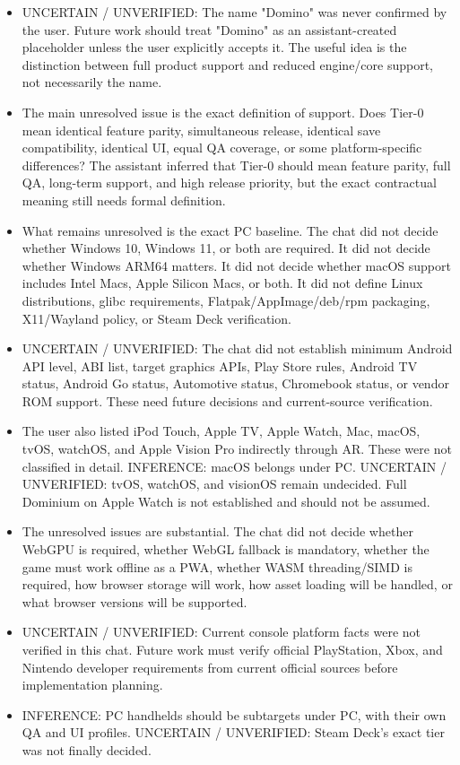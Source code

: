 \documentclass[11pt,a4paper]{report}
\begin{document}
\begin{itemize}
\item UNCERTAIN / UNVERIFIED: The name "Domino" was never confirmed by the user. Future work should treat "Domino" as an assistant-created placeholder unless the user explicitly accepts it. The useful idea is the distinction between full product support and reduced engine/core support, not necessarily the name.
\item The main unresolved issue is the exact definition of support. Does Tier-0 mean identical feature parity, simultaneous release, identical save compatibility, identical UI, equal QA coverage, or some platform-specific differences? The assistant inferred that Tier-0 should mean feature parity, full QA, long-term support, and high release priority, but the exact contractual meaning still needs formal definition.
\item What remains unresolved is the exact PC baseline. The chat did not decide whether Windows 10, Windows 11, or both are required. It did not decide whether Windows ARM64 matters. It did not decide whether macOS support includes Intel Macs, Apple Silicon Macs, or both. It did not define Linux distributions, glibc requirements, Flatpak/AppImage/deb/rpm packaging, X11/Wayland policy, or Steam Deck verification.
\item UNCERTAIN / UNVERIFIED: The chat did not establish minimum Android API level, ABI list, target graphics APIs, Play Store rules, Android TV status, Android Go status, Automotive status, Chromebook status, or vendor ROM support. These need future decisions and current-source verification.
\item The user also listed iPod Touch, Apple TV, Apple Watch, Mac, macOS, tvOS, watchOS, and Apple Vision Pro indirectly through AR. These were not classified in detail. INFERENCE: macOS belongs under PC. UNCERTAIN / UNVERIFIED: tvOS, watchOS, and visionOS remain undecided. Full Dominium on Apple Watch is not established and should not be assumed.
\item The unresolved issues are substantial. The chat did not decide whether WebGPU is required, whether WebGL fallback is mandatory, whether the game must work offline as a PWA, whether WASM threading/SIMD is required, how browser storage will work, how asset loading will be handled, or what browser versions will be supported.
\item UNCERTAIN / UNVERIFIED: Current console platform facts were not verified in this chat. Future work must verify official PlayStation, Xbox, and Nintendo developer requirements from current official sources before implementation planning.
\item INFERENCE: PC handhelds should be subtargets under PC, with their own QA and UI profiles. UNCERTAIN / UNVERIFIED: Steam Deck's exact tier was not finally decided.
\end{itemize}
\end{document}
